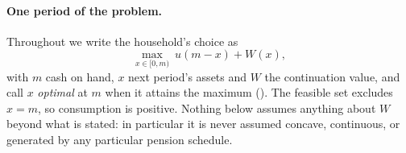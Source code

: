 \paragraph{One period of the problem.} Throughout we write the household's choice as
\begin{equation}\label{eq:step}
  \max_{x\in[0,m)}\ u(m-x)+W(x),
\end{equation}
with $m$ cash on hand, $x$ next period's assets and $W$ the continuation value, and call $x$
\emph{optimal} at $m$ when it attains the maximum (). The feasible set
excludes $x=m$, so consumption is positive. Nothing below assumes anything about $W$ beyond what
is stated: in particular it is never assumed concave, continuous, or generated by any particular
pension schedule.
